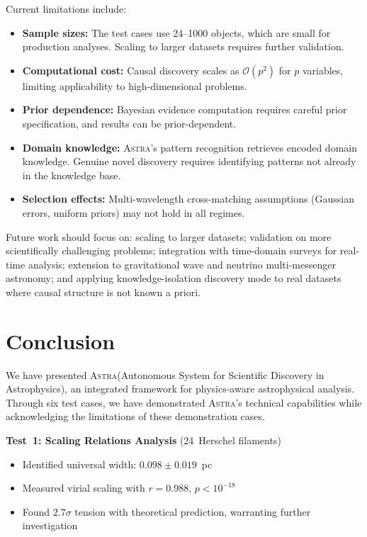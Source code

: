 \documentclass[fleqn,usenatbib]{mnras}
\newcommand{\astra}{\textsc{Astra}\xspace}
\begin{document}
Current limitations include:
\begin{itemize}
  \item \textbf{Sample sizes:} The test cases use 24--1000 objects, which are small for production analyses. Scaling to larger datasets requires further validation.
  \item \textbf{Computational cost:} Causal discovery scales as $\mathcal{O}(p^2)$ for $p$ variables, limiting applicability to high-dimensional problems.
  \item \textbf{Prior dependence:} Bayesian evidence computation requires careful prior specification, and results can be prior-dependent.
  \item \textbf{Domain knowledge:} \astra's pattern recognition retrieves encoded domain knowledge. Genuine novel discovery requires identifying patterns not already in the knowledge base.
  \item \textbf{Selection effects:} Multi-wavelength cross-matching assumptions (Gaussian errors, uniform priors) may not hold in all regimes.
\end{itemize}

Future work should focus on: scaling to larger datasets; validation on more scientifically challenging problems; integration with time-domain surveys for real-time analysis; extension to gravitational wave and neutrino multi-messenger astronomy; and applying knowledge-isolation discovery mode to real datasets where causal structure is not known a priori.

\section{Conclusion}
\label{sec:conclusion}

We have presented \astra (Autonomous System for Scientific Discovery in Astrophysics), an integrated framework for physics-aware astrophysical analysis.
Through six test cases, we have demonstrated \astra's technical capabilities while acknowledging the limitations of these demonstration cases.

\textbf{Test~1: Scaling Relations Analysis} (24~Herschel filaments)
\begin{itemize}
  \item Identified universal width: $0.098 \pm 0.019$~pc
  \item Measured virial scaling with $r = 0.988$, $p < 10^{-18}$
  \item Found $2.7\sigma$ tension with theoretical prediction, warranting further investigation
\end{itemize}
\end{document}
